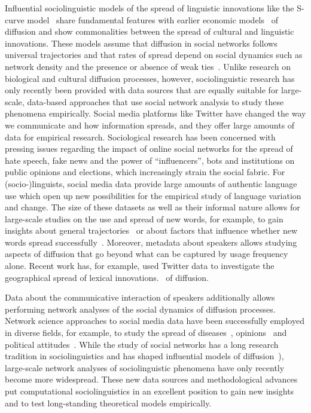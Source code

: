 \documentclass[draft, a4paper, abstract=on]{scrartcl}
\begin{document}
Influential sociolinguistic models of the spread of linguistic innovations like the S-curve model~\parencite{Milroy1992LinguisticVariation} share fundamental features with earlier economic models~\parencite{Rogers1962DiffusionInnovations} of diffusion and show commonalities between the spread of cultural and linguistic innovations. These models assume that diffusion in social networks follows universal trajectories and that rates of spread depend on social dynamics such as network density and the presence or absence of weak ties~\parencite{Granovetter1977StrengthWeak}. Unlike research on biological and cultural diffusion processes, however, sociolinguistic research has only recently been provided with data sources that are equally suitable for large-scale, data-based approaches that use social network analysis to study these phenomena empirically.
Social media platforms like Twitter have changed the way we communicate and how information spreads, and they offer large amounts of data for empirical research. Sociological research has been concerned with pressing issues regarding the impact of online social networks for the spread of hate speech, fake news and the power of \enquote{influencers}, bots and institutions on public opinions and elections, which increasingly strain the social fabric. For (socio-)linguists, social media data provide large amounts of authentic language use which open up new possibilities for the empirical study of language variation and change. The size of these datasets as well as their informal nature allows for large-scale studies on the use and spread of new words, for example, to gain insights about general trajectories~\parencite{Nini2017ApplicationGrowth} or about factors that influence whether new words spread successfully~\parencite{Grieve2018NaturalSelection}. Moreover, metadata about speakers allows studying aspects of diffusion that go beyond what can be captured by usage frequency alone. Recent work has, for example, used Twitter data to investigate the geographical spread of lexical innovations.~\parencite{Eisenstein2014DiffusionLexical,Grieve2017GeographicalPatterns,Grieve2018MappingLexical} of diffusion.

Data about the communicative interaction of speakers additionally allows performing network analyses of the social dynamics of diffusion processes. Network science approaches to social media data have been successfully employed in diverse fields, for example, to study the spread of diseases~\parencite{Lu2018AccurateInfluenza}, opinions~\parencite{West2014ExploitingSocial} and political attitudes~\parencite{PewResearchCenter2019NationalPolitics}. While the study of social networks has a long research tradition in sociolinguistics and has shaped influential models of diffusion~\parencite[e.g.][]{Milroy1985LinguisticChange}), large-scale network analyses of sociolinguistic phenomena have only recently become more widespread. These new data sources and methodological advances put computational sociolinguistics in an excellent position to gain new insights and to test long-standing theoretical models empirically.
\end{document}
